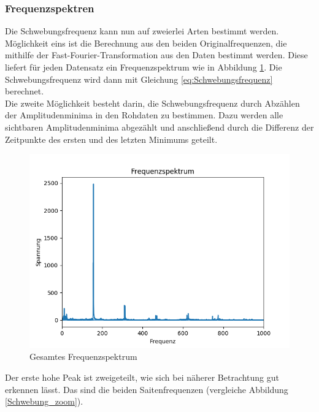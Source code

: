 \documentclass[12pt,a4paper]{article}
\begin{document}
\subsubsection{Frequenzspektren}
Die Schwebungsfrequenz kann nun auf zweierlei Arten bestimmt werden. Möglichkeit eins ist die Berechnung aus den beiden Originalfrequenzen, die mithilfe der Fast-Fourier-Transformation aus den Daten bestimmt werden. Diese liefert für jeden Datensatz ein Frequenzspektrum wie in Abbildung \ref{Schwebung_Frequenzspektrum}. Die Schwebungsfrequenz wird dann mit Gleichung \ref{eq:Schwebungsfrequenz} berechnet. \\
Die zweite Möglichkeit besteht darin, die Schwebungsfrequenz durch Abzählen der Amplitudenminima in den Rohdaten zu bestimmen. Dazu werden alle sichtbaren Amplitudenminima abgezählt und anschließend durch die Differenz der Zeitpunkte des ersten und des letzten Minimums geteilt.
\begin{figure}
\includegraphics[scale=0.9]{Bilder/Frequenzspektrum_ges.png}
\centering
\caption{Gesamtes Frequenzspektrum}
\label{Schwebung_Frequenzspektrum}
\end{figure}
Der erste hohe Peak ist zweigeteilt, wie sich bei näherer Betrachtung gut erkennen lässt. Das sind die beiden Saitenfrequenzen (vergleiche Abbildung \ref{Schwebung_zoom}).
\end{document}
